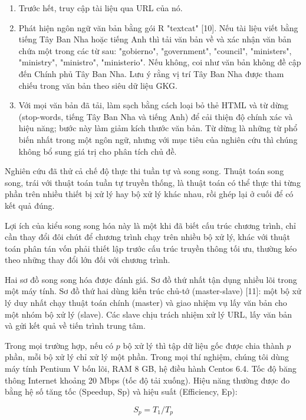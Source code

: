 \begin{enumerate}
\def\labelenumi{\arabic{enumi}.}
\item
  Trước hết, truy cập tài liệu qua URL của nó.
\item
  Phát hiện ngôn ngữ văn bản bằng gói R "textcat" {[}10{]}. Nếu tài liệu viết bằng tiếng Tây Ban Nha hoặc tiếng Anh thì tải văn bản về và xác nhận văn bản chứa một trong các từ sau: "gobierno", "government", "council", "ministers", "ministry", "ministro", "ministerio". Nếu không, coi như văn bản không đề cập đến Chính phủ Tây Ban Nha. Lưu ý rằng vị trí Tây Ban Nha được tham chiếu trong văn bản theo siêu dữ liệu GKG.
\item
  Với mọi văn bản đã tải, làm sạch bằng cách loại bỏ thẻ HTML và từ dừng (stop-words, tiếng Tây Ban Nha và tiếng Anh) để cải thiện độ chính xác và hiệu năng; bước này làm giảm kích thước văn bản. Từ dừng là những từ phổ biến nhất trong một ngôn ngữ, nhưng với mục tiêu của nghiên cứu thì chúng không bổ sung giá trị cho phân tích chủ đề.
\end{enumerate}

Nghiên cứu đã thử cả chế độ thực thi tuần tự và song song. Thuật toán song song, trái với thuật toán tuần tự truyền thống, là thuật toán có thể thực thi từng phần trên nhiều thiết bị xử lý hay bộ xử lý khác nhau, rồi ghép lại ở cuối để có kết quả đúng.

Lợi ích của kiểu song song hóa này là một khi đã biết cấu trúc chương trình, chỉ cần thay đổi đôi chút để chương trình chạy trên nhiều bộ xử lý, khác với thuật toán phân tán vốn phải thiết lập trước cấu trúc truyền thông tối ưu, thường kéo theo những thay đổi lớn đối với chương trình.

Hai sơ đồ song song hóa được đánh giá. Sơ đồ thứ nhất tận dụng nhiều lõi trong một máy tính. Sơ đồ thứ hai dùng kiến trúc chủ-tớ (master-slave) {[}11{]}: một bộ xử lý duy nhất chạy thuật toán chính (master) và giao nhiệm vụ lấy văn bản cho một nhóm bộ xử lý (slave). Các slave chịu trách nhiệm xử lý URL, lấy văn bản và gửi kết quả về tiến trình trung tâm.

Trong mọi trường hợp, nếu có \(p\) bộ xử lý thì tập dữ liệu gốc được chia thành \(p\) phần, mỗi bộ xử lý chỉ xử lý một phần. Trong mọi thí nghiệm, chúng tôi dùng máy tính Pentium V bốn lõi, RAM 8 GB, hệ điều hành Centos 6.4. Tốc độ băng thông Internet khoảng 20 Mbps (tốc độ tải xuống). Hiệu năng thường được đo bằng hệ số tăng tốc (Speedup, Sp) và hiệu suất (Efficiency, Ep):

\begin{equation*}S_p = T_1 / T_p \tag{1}\end{equation*}

